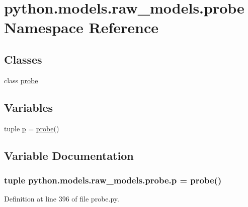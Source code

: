 \hypertarget{namespacepython_1_1models_1_1raw__models_1_1probe}{\section{python.\-models.\-raw\-\_\-models.\-probe Namespace Reference}
\label{namespacepython_1_1models_1_1raw__models_1_1probe}
}
\subsection*{Classes}
\begin{DoxyCompactItemize}
\item 
class \hyperlink{classpython_1_1models_1_1raw__models_1_1probe_1_1probe}{probe}
\end{DoxyCompactItemize}
\subsection*{Variables}
\begin{DoxyCompactItemize}
\item 
tuple \hyperlink{namespacepython_1_1models_1_1raw__models_1_1probe_abd27b11ab377a74cc4a43fb2a6b77ad5}{p} = \hyperlink{classpython_1_1models_1_1raw__models_1_1probe_1_1probe}{probe}()
\end{DoxyCompactItemize}


\subsection{Variable Documentation}
\hypertarget{namespacepython_1_1models_1_1raw__models_1_1probe_abd27b11ab377a74cc4a43fb2a6b77ad5}{
\subsubsection[{p}]{\setlength{\rightskip}{0pt plus 5cm}tuple python.\-models.\-raw\-\_\-models.\-probe.\-p = {\bf probe}()}}\label{namespacepython_1_1models_1_1raw__models_1_1probe_abd27b11ab377a74cc4a43fb2a6b77ad5}


Definition at line 396 of file probe.\-py.

